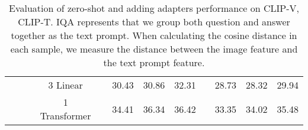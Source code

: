 \documentclass[runningheads]{llncs}
\begin{document}
\begin{table*}[h!]
{\begin{tabular}{|ccc|c|cccccccc|}
\multicolumn{1}{|c|}{}                                    & \multicolumn{1}{c|}{}                        &                         & 3 Linear              & \multicolumn{1}{c|}{}      & \multicolumn{1}{c|}{30.43} & \multicolumn{1}{c|}{30.86} & \multicolumn{1}{c|}{32.31} & \multicolumn{1}{c|}{}      & \multicolumn{1}{c|}{28.73} & \multicolumn{1}{c|}{28.32} & 29.94 \\ \cline{4-12}
\multicolumn{1}{|c|}{}                                    & \multicolumn{1}{c|}{}                        &                         & 1 Transformer         & \multicolumn{1}{c|}{}      & \multicolumn{1}{c|}{34.41} & \multicolumn{1}{c|}{36.34} & \multicolumn{1}{c|}{36.42} & \multicolumn{1}{c|}{}      & \multicolumn{1}{c|}{33.35} & \multicolumn{1}{c|}{34.02} & 35.48 \\ \hline
\end{tabular}}
\caption{Evaluation of zero-shot and adding adapters performance on CLIP-V, CLIP-T. IQA represents that we group both question and answer together as the text prompt. When calculating the cosine distance in each sample, we measure the distance between the image feature and the text prompt feature.}
\label{vcr_adapterl}
\end{table*}
\end{document}
